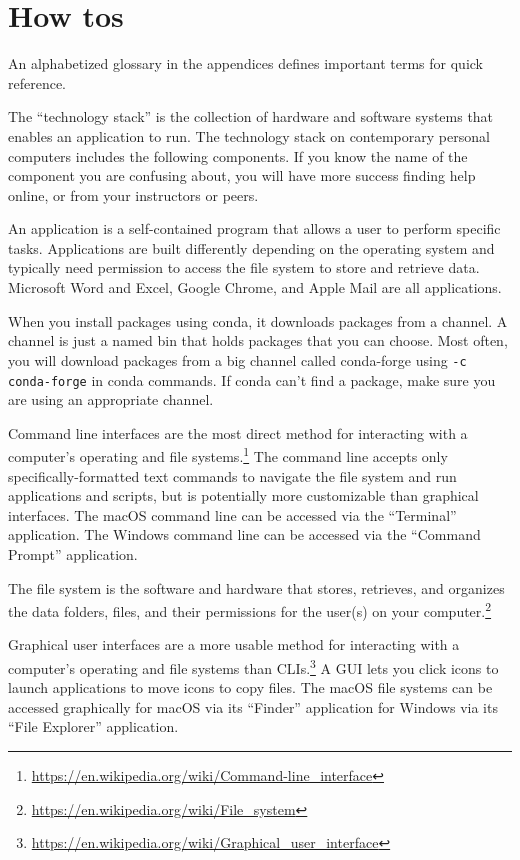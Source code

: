 \chapter{How tos}

An alphabetized glossary in the appendices defines important terms for quick reference.

The ``technology stack'' is the collection of hardware and software systems that enables an application to run. The technology stack on contemporary personal computers includes the following components. If you know the name of the component you are confusing about, you will have more success finding help online, or from your instructors or peers.

\begin{description}[noitemsep]
    \item[Application.] An application is a self-contained program that allows a user to perform specific tasks. Applications are built differently depending on the operating system and typically need permission to access the file system to store and retrieve data. Microsoft Word and Excel, Google Chrome, and Apple Mail are all applications.
    \item[Channel.] When you install packages using conda, it downloads packages from a channel. A channel is just a named bin that holds packages that you can choose. Most often, you will download packages from a big channel called conda-forge using \texttt{-c conda-forge} in conda commands. If conda can't find a package, make sure you are using an appropriate channel.
    \item[Command line interface (CLI).] Command line interfaces are the most direct method for interacting with a computer's operating and file systems.\footnote{\url{https://en.wikipedia.org/wiki/Command-line_interface}} The command line accepts only specifically-formatted text commands to navigate the file system and run applications and scripts, but is potentially more customizable than graphical interfaces. The macOS command line can be accessed via the ``Terminal'' application. The Windows command line can be accessed via the ``Command Prompt'' application.
    \item[File system.] The file system is the software and hardware that stores, retrieves, and organizes the data folders, files, and their permissions for the user(s) on your computer.\footnote{\url{https://en.wikipedia.org/wiki/File_system}}
    \item[Graphical user interface (GUI).] Graphical user interfaces are a more usable method for interacting with a computer's operating and file systems than CLIs.\footnote{\url{https://en.wikipedia.org/wiki/Graphical_user_interface}} A GUI lets you click icons to launch applications to move icons to copy files. The macOS file systems can be accessed graphically for macOS via its ``Finder'' application for Windows via its ``File Explorer'' application.

\end{description}
